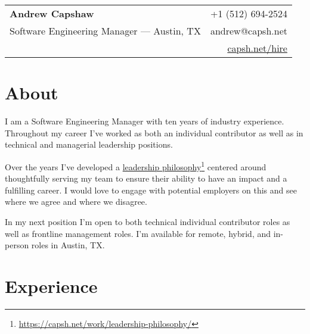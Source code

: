 \documentclass[11pt]{amsart}
\begin{document}
\pagestyle{fancy}

% 
%
\begin{tabularx}{\textwidth}{@{}Xr@{}}
\textbf{Andrew Capshaw} & +1 (512) 694-2524  \\
Software Engineering Manager — Austin, TX & andrew@capsh.net \\
& \href{https://capsh.net/hire}{capsh.net/hire} \\
\end{tabularx}


\section{About}

I am a Software Engineering Manager with ten years of industry experience. Throughout my career I've worked as both an individual contributor as well as in technical and managerial leadership positions. 

Over the years I've developed a \href{https://capsh.net/work/leadership-philosophy/}{leadership philosophy}\footnote{\url{https://capsh.net/work/leadership-philosophy/}} centered around thoughtfully serving my team to ensure their ability to have an impact and a fulfilling career. I would love to engage with potential employers on this and see where we agree and where we disagree.

In my next position I'm open to both technical individual contributor roles as well as frontline management roles. I'm available for remote, hybrid, and in-person roles in Austin, TX. 

\bigskip
\section{Experience}
\end{document}

